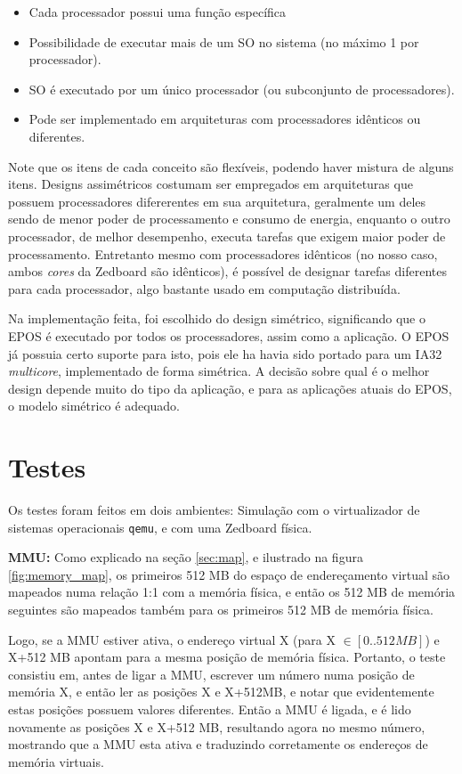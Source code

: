{		\begin{itemize}
			\item Cada processador possui uma função específica
			\item Possibilidade de executar mais de um SO no sistema (no máximo 1 por processador).
			\item SO é executado por um único processador (ou subconjunto de processadores).
			\item Pode ser implementado em arquiteturas com processadores idênticos ou diferentes.
		\end{itemize}

Note que os itens de cada conceito são flexíveis, podendo haver mistura de alguns itens.
Designs assimétricos costumam ser empregados em arquiteturas que possuem processadores difererentes em sua arquitetura, geralmente um deles sendo de menor poder de processamento e consumo de energia, enquanto o outro processador, de melhor desempenho, executa tarefas que exigem maior poder de processamento. Entretanto mesmo com processadores idênticos (no nosso caso, ambos \emph{cores} da Zedboard são idênticos), é possível de designar tarefas diferentes para cada processador, algo bastante usado em computação distribuída.

Na implementação feita, foi escolhido do design simétrico, significando que o EPOS é executado por todos os processadores, assim como a aplicação. O EPOS já possuia certo suporte para isto, pois ele ha havia sido portado para um IA32 \emph{multicore}, implementado de forma simétrica.
A decisão sobre qual é o melhor design depende muito do tipo da aplicação, e para as aplicações atuais do EPOS, o modelo simétrico é adequado.


\section{Testes}

Os testes foram feitos em dois ambientes: Simulação com o virtualizador de sistemas operacionais \verb=qemu=, e com uma Zedboard física.

\textbf{MMU: }
Como explicado na seção \ref{sec:map}, e ilustrado na figura \ref{fig:memory_map}, os primeiros 512 MB do espaço de endereçamento virtual são mapeados numa relação 1:1 com a memória física, e então os 512 MB de memória seguintes são mapeados também para os primeiros 512 MB de memória física.

Logo, se a MMU estiver ativa, o endereço virtual X (para X $\in [0..512MB]$) e X+512 MB apontam para a mesma posição de memória física.
Portanto, o teste consistiu em, antes de ligar a MMU, escrever um número numa posição de memória X, e então ler as posições X e X+512MB, e notar que evidentemente estas posições possuem valores diferentes. Então a MMU é ligada, e é lido novamente as posições X e X+512 MB, resultando agora no mesmo número, mostrando que a MMU esta ativa e traduzindo corretamente os endereços de memória virtuais.

}
